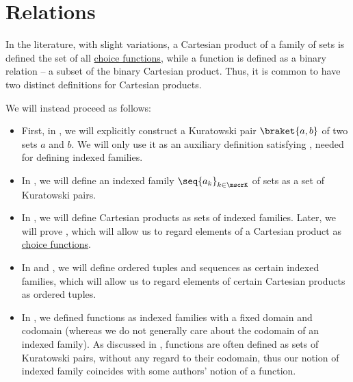 \section{Relations}\label{sec:relations}

\begin{remark}\label{rem:cartesian_products_and_functions}
  In the literature, with slight variations, a Cartesian product of a family of sets is defined the set of all \hyperref[def:choce_function]{choice functions}, while a function is defined as a binary relation -- a subset of the binary Cartesian product. Thus, it is common to have two distinct definitions for Cartesian products.

  We will instead proceed as follows:
  \begin{itemize}
    \item First, in , we will explicitly construct a Kuratowski pair \( \braket{ a, b } \) of two sets \( a \) and \( b \). We will only use it as an auxiliary definition satisfying , needed for defining indexed families.

    \item In , we will define an indexed family \( \seq{ a_k }_{k \in \mscrK} \) of sets as a set of Kuratowski pairs.

    \item In , we will define Cartesian products as sets of indexed families. Later, we will prove , which will allow us to regard elements of a Cartesian product as \hyperref[def:choice_function]{choice functions}.

    \item In  and , we will define ordered tuples and sequences as certain indexed families, which will allow us to regard elements of certain Cartesian products as ordered tuples.

    \item In , we defined functions as indexed families with a fixed domain and codomain (whereas we do not generally care about the codomain of an indexed family). As discussed in , functions are often defined as sets of Kuratowski pairs, without any regard to their codomain, thus our notion of indexed family coincides with some authors' notion of a function.
  \end{itemize}


\end{remark}
